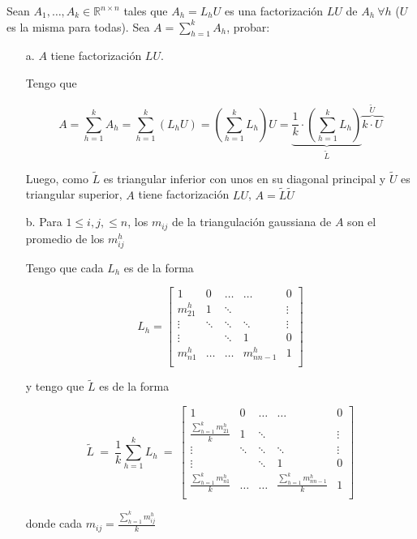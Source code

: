 Sean $A_1,\ldots,A_k \in \mathbb{R}^{n \times n}$ tales que $A_h = L_h U$ es una factorización $LU$ de $A_h~\forall h$ ($U$ es la misma para todas). Sea $A = \sum_{h=1}^{k}A_h$, probar:
\begin{itemize}
    \item[a.] $A$ tiene factorización $LU$.
    
    Tengo que 
    
    \[A = \sum_{h=1}^{k}A_h = \sum_{h=1}^{k}(L_h U) = (\sum_{h=1}^{k}L_h)U = \underbrace{\frac{1}{k}\cdot(\sum_{h=1}^{k}L_h)}_{\widetilde{L}}\overbrace{k\cdot U}^{\widetilde{U}}\]
    
    Luego, como $\widetilde{L}$ es triangular inferior con unos en su diagonal principal y $\widetilde{U}$ es triangular superior, $A$ tiene factorización $LU$, $A = \widetilde{L}\widetilde{U}$ 
    
    \item[b.] Para $1 \leq i,j, \leq n$, los $m_{ij}$ de la triangulación gaussiana de $A$ son el promedio de los $m_{ij}^{h}$
    
    Tengo que cada $L_h$ es de la forma 
    
    \[
    L_h =
    \begin{bmatrix}
        1 & 0 & \ldots & \ldots & 0 \\
        m_{21}^{h} & 1 & \ddots &  & \vdots \\
        \vdots & \ddots & \ddots & \ddots & \vdots \\
        \vdots &  & \ddots & 1 & 0 \\
        m_{n1}^{h} & \ldots & \ldots & m_{nn-1}^{h} & 1 \\
    \end{bmatrix}
    \]
    
    y tengo que $\widetilde{L}$ es de la forma 
    
    \[
    \widetilde{L} ~=~ \frac{1}{k}\sum_{h = 1}^{k}L_h ~=~
    \begin{bmatrix}
        1 & 0 & \ldots & \ldots & 0 \\
        \frac{\sum_{h=1}^{k}m_{21}^{h}}{k} & 1 & \ddots &  & \vdots \\
        \vdots & \ddots & \ddots & \ddots & \vdots \\
        \vdots &  & \ddots & 1 & 0 \\
        \frac{\sum_{h=1}^{k}m_{n1}^{h}}{k} & \ldots & \ldots & \frac{\sum_{h=1}^{k}m_{nn-1}^{h}}{k} & 1 \\
    \end{bmatrix}
    \]
    
    donde cada $m_{ij} = \frac{\sum_{h=1}^{k}m_{ij}^{h}}{k}$
\end{itemize}

